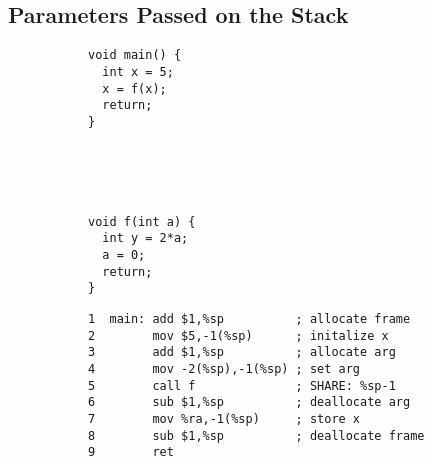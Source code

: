 \documentclass[acmsmall,review,anonymous]{acmart}\settopmatter{printfolios=true,printccs=false,printacmref=false}
\begin{document}
{\subsection{Parameters Passed on the Stack}
\label{sec:passing}

\newcommand{\mainpassc}{magenta}

\begin{figure}
  \centering
  \begin{subfigure}[t]{.2\textwidth}
{\small
\begin{verbatim}
void main() {
  int x = 5;
  x = f(x);
  return;
}





void f(int a) {
  int y = 2*a;
  a = 0;
  return;
}
\end{verbatim}
}
  \end{subfigure}
  \begin{subfigure}[t]{.6\textwidth}
{\small
\begin{verbatim}
1  main: add $1,%sp          ; allocate frame
2        mov $5,-1(%sp)      ; initalize x
3        add $1,%sp          ; allocate arg
4        mov -2(%sp),-1(%sp) ; set arg
5        call f              ; SHARE: %sp-1
6        sub $1,%sp          ; deallocate arg
7        mov %ra,-1(%sp)     ; store x
8        sub $1,%sp          ; deallocate frame
9        ret


\end{verbatim}}
\end{subfigure}
\end{figure}}
\end{document}
